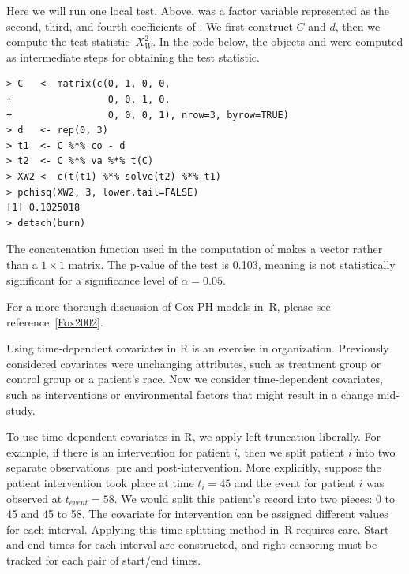 \documentclass[11pt]{article}
\newcommand{\R}[1]{\textsf{R}}
\begin{document}
Here we will run one local test. Above,  was a factor variable represented as the second, third, and fourth coefficients of . We first construct $C$ and $d$, then we compute the test statistic~$X^2_W$. In the code below, the objects  and  were computed as intermediate steps for obtaining the test statistic.
{\color{verbatimrcom}\begin{verbatim}
> C   <- matrix(c(0, 1, 0, 0,
+                 0, 0, 1, 0,
+                 0, 0, 0, 1), nrow=3, byrow=TRUE)
> d   <- rep(0, 3)
> t1  <- C %*% co - d
> t2  <- C %*% va %*% t(C)
> XW2 <- c(t(t1) %*% solve(t2) %*% t1)
> pchisq(XW2, 3, lower.tail=FALSE)
[1] 0.1025018
> detach(burn)
\end{verbatim}}
The concatenation function  used in the computation of  makes  a vector rather than a $1\times1$ matrix. The p-value of the test is 0.103, meaning  is not statistically significant for a significance level of $\alpha=0.05$.

For a more thorough discussion of Cox PH models in~\R{}, please see reference~\ref{Fox2002}.

\pagebreak

{}
\label{coxPHTimeDepCov}

Using time-dependent covariates in \R{} is an exercise in organization. Previously considered covariates were unchanging attributes, such as treatment group or control group or a patient's race. Now we consider time-dependent covariates, such as interventions or environmental factors that might result in a change mid-study.

To use time-dependent covariates in \R{}, we apply left-truncation liberally. For example, if there is an intervention for patient $i$, then we split patient $i$ into two separate observations: pre and post-intervention. More explicitly, suppose the patient intervention took place at time $t_{i} = 45$ and the event for patient $i$ was observed at $t_{event}=58$. We would split this patient's record into two pieces: 0 to 45 and 45 to 58. The covariate for intervention can be assigned different values for each interval. Applying this time-splitting method in~\R{} requires care. Start and end times for each interval are constructed, and right-censoring must be tracked for each pair of start/end times.
\end{document}

